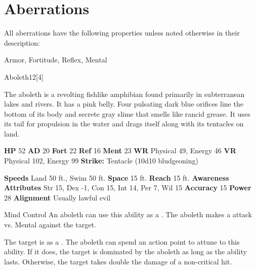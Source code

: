 
        \section{Aberrations}

        All aberrations have the following properties unless noted otherwise in their description:
        
    
     Armor,
     Fortitude,
     Reflex,
     Mental
  
  
      
  \begin{monsection}{Aboleth}{12}[4]
    \vspace{-1em}\vspace{-1em}
    \vspace{0em}

    
    The aboleth is a revolting fishlike amphibian found primarily in subterranean lakes and rivers.
    It has a pink belly.
    Four pulsating dark blue orifices line the bottom of its body and secrete gray slime that smells like rancid grease.
    It uses its tail for propulsion in the water and drags itself along with its tentacles on land.
  
    

    \begin{spellcontent}
      \begin{spelltargetinginfo}
        \pari \textbf{HP} 52 \monsep
          \textbf{AD} 20 \monsep
          \textbf{Fort} 22 \monsep
          \textbf{Ref} 16 \monsep
          \textbf{Ment} 23
        \pari \textbf{WR} Physical 49, Energy 46 \monsep
        \textbf{VR} Physical 102, Energy 99
        \pari \textbf{Strike:}
            Tentacle  (10d10 bludgeoning)
      \end{spelltargetinginfo}
    \end{spellcontent}
    \begin{monsterfooter}
      \pari \textbf{Speeds} Land 50 ft., Swim 50 ft. \monsep
        \textbf{Space} 15 ft. \monsep
        \textbf{Reach} 15 ft.
      \pari \textbf{Awareness} 
      \pari \textbf{Attributes}
        Str 15, Dex -1,
        Con 15, Int 14,
        Per 7, Wil 15
      \pari \textbf{Accuracy} 15 \monsep
        \textbf{Power} 28
      \pari \textbf{Alignment} Usually lawful evil
    \end{monsterfooter}
  \end{monsection}
  \begin{freeability}{Mind Control}
      An aboleth can use this ability as a . The aboleth makes a  attack
        vs. Mental against the target.
    
    \hit The target is  as a .
    \crit 
        The aboleth can spend an action point to attune to this ability.
        If it does, the target is dominated by the aboleth as long as the ability lasts.
        Otherwise, the target takes double the damage of a non-critical hit.
    \end{freeability}
  

